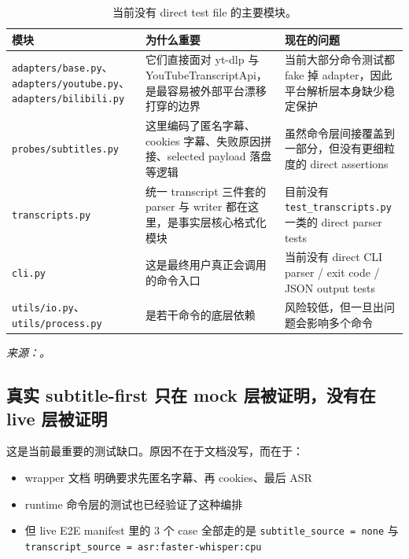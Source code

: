\documentclass[a4paper]{article}
\begin{document}
\begin{table}[H]
\centering
\small
\begin{tabularx}{\textwidth}{>{\raggedright\arraybackslash}p{3.2cm}YY}
\toprule
模块 & 为什么重要 & 现在的问题 \\
\midrule
\texttt{adapters/base.py}、\texttt{adapters/youtube.py}、\texttt{adapters/bilibili.py} & 它们直接面对 yt-dlp 与 YouTubeTranscriptApi，是最容易被外部平台漂移打穿的边界 & 当前大部分命令测试都 fake 掉 adapter，因此平台解析层本身缺少稳定保护 \\
\texttt{probes/subtitles.py} & 这里编码了匿名字幕、cookies 字幕、失败原因拼接、selected payload 落盘等逻辑 & 虽然命令层间接覆盖到一部分，但没有更细粒度的 direct assertions \\
\texttt{transcripts.py} & 统一 transcript 三件套的 parser 与 writer 都在这里，是事实层核心格式化模块 & 目前没有 \texttt{test\_transcripts.py} 一类的 direct parser tests \\
\texttt{cli.py} & 这是最终用户真正会调用的命令入口 & 当前没有 direct CLI parser / exit code / JSON output tests \\
\texttt{utils/io.py}、\texttt{utils/process.py} & 是若干命令的底层依赖 & 风险较低，但一旦出问题会影响多个命令 \\
\bottomrule
\end{tabularx}
\caption{当前没有 direct test file 的主要模块。}
\end{table}

\noindent\small\emph{来源：。}\normalsize

\subsection{真实 subtitle-first 只在 mock 层被证明，没有在 live 层被证明}

这是当前最重要的测试缺口。原因不在于文档没写，而在于：

\begin{itemize}
\item wrapper 文档  明确要求先匿名字幕、再 cookies、最后 ASR
\item runtime 命令层的测试也已经验证了这种编排
\item 但 live E2E manifest 里的 3 个 case 全部走的是 \texttt{subtitle\_source = none} 与 \texttt{transcript\_source = asr:faster-whisper:cpu}
\end{itemize}
\end{document}
